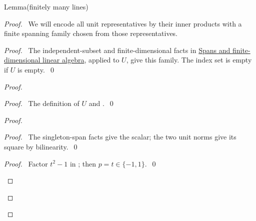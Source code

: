\begin{mergedproofsection}
\begin{namedresult}{Lemma}{(finitely many lines)}\label{lem:312-finite}
\end{namedresult}
\begin{proof}
\pfsketch\ We will encode all unit representatives by their inner
products with a finite spanning family chosen from those representatives.
\pflet{\[
\begin{gathered}
U=\{\Zx:\exists\ell\in S,\ \Zx\in\ell\text{ and }q(\Zx)=1\},
\qquad W=\opk{span}_{\re}U,\\
\Theta=\{-1,-1/\sqrt2,-1/2,0,1/2,1/\sqrt2,1\}.
\end{gathered}
\]}
\begin{proof}\pf\ The independent-subset and finite-dimensional facts
in \hyperref[facts:312-linear]{Spans and finite-dimensional linear algebra}, applied to $U$, give this family. The index set
is empty if $U$ is empty.~\qed\end{proof}
\begin{proof}
 \begin{proof}\pf\ The definition of $U$ and .~\qed\end{proof}
 \begin{proof}
  \begin{proof}\pf\ The singleton-span facts give the scalar; the two
  unit norms give its square by bilinearity.~\qed\end{proof}
  \qedstep
  \begin{proof}\pf\ Factor $t^2-1$ in ;
  then $p=t\in\{-1,1\}$.~\qed\end{proof}

\end{proof}
\end{proof}
\end{proof}
\end{mergedproofsection}
